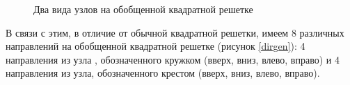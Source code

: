 \documentclass[utf8,12pt]{jetp}
\begin{document}
\begin{figure}[h]
	\begin{minipage}[h]{0.4\linewidth}
	\end{minipage}
	\hfill
	\begin{minipage}[h]{0.4\linewidth}
	\end{minipage}
	\caption{Два вида узлов на обобщенной квадратной решетке }
	\label{point}
\end{figure}

В связи с этим, в отличие от обычной квадратной решетки, имеем 8 различных направлений на обобщенной квадратной решетке (рисунок \ref{dirgen}): 4 направления из узла , обозначенного кружком (вверх, вниз, влево, вправо) и 4 направления из узла, обозначенного крестом (вверх, вниз, влево, вправо).
\end{document}
